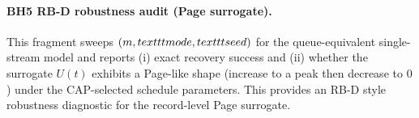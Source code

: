\paragraph{BH5 RB-D robustness audit (Page surrogate).} \AuditTag This fragment sweeps $(m,\\texttt{mode},\\texttt{seed})$ for the queue-equivalent single-stream model and reports (i) exact recovery success and (ii) whether the surrogate $U(t)$ exhibits a Page-like shape (increase to a peak then decrease to $0$) under the CAP-selected schedule parameters. This provides an RB-D style robustness diagnostic for the record-level Page surrogate.